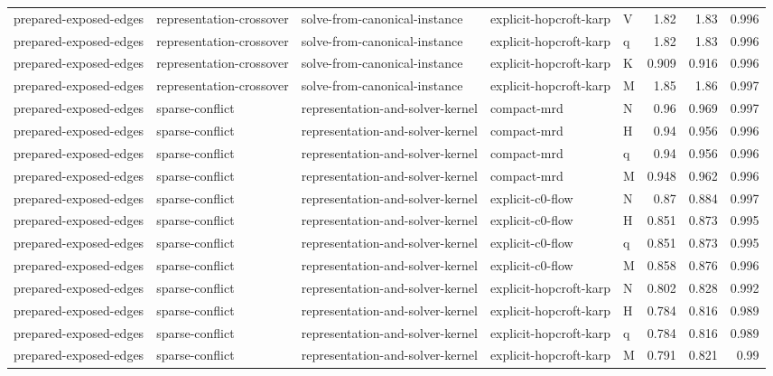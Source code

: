\begin{table}[t]
\begin{tabular}{lllllrrr}
prepared-exposed-edges & representation-crossover & solve-from-canonical-instance & explicit-hopcroft-karp & V & 1.82 & 1.83 & 0.996 \\
prepared-exposed-edges & representation-crossover & solve-from-canonical-instance & explicit-hopcroft-karp & q & 1.82 & 1.83 & 0.996 \\
prepared-exposed-edges & representation-crossover & solve-from-canonical-instance & explicit-hopcroft-karp & K & 0.909 & 0.916 & 0.996 \\
prepared-exposed-edges & representation-crossover & solve-from-canonical-instance & explicit-hopcroft-karp & M & 1.85 & 1.86 & 0.997 \\
prepared-exposed-edges & sparse-conflict & representation-and-solver-kernel & compact-mrd & N & 0.96 & 0.969 & 0.997 \\
prepared-exposed-edges & sparse-conflict & representation-and-solver-kernel & compact-mrd & H & 0.94 & 0.956 & 0.996 \\
prepared-exposed-edges & sparse-conflict & representation-and-solver-kernel & compact-mrd & q & 0.94 & 0.956 & 0.996 \\
prepared-exposed-edges & sparse-conflict & representation-and-solver-kernel & compact-mrd & M & 0.948 & 0.962 & 0.996 \\
prepared-exposed-edges & sparse-conflict & representation-and-solver-kernel & explicit-c0-flow & N & 0.87 & 0.884 & 0.997 \\
prepared-exposed-edges & sparse-conflict & representation-and-solver-kernel & explicit-c0-flow & H & 0.851 & 0.873 & 0.995 \\
prepared-exposed-edges & sparse-conflict & representation-and-solver-kernel & explicit-c0-flow & q & 0.851 & 0.873 & 0.995 \\
prepared-exposed-edges & sparse-conflict & representation-and-solver-kernel & explicit-c0-flow & M & 0.858 & 0.876 & 0.996 \\
prepared-exposed-edges & sparse-conflict & representation-and-solver-kernel & explicit-hopcroft-karp & N & 0.802 & 0.828 & 0.992 \\
prepared-exposed-edges & sparse-conflict & representation-and-solver-kernel & explicit-hopcroft-karp & H & 0.784 & 0.816 & 0.989 \\
prepared-exposed-edges & sparse-conflict & representation-and-solver-kernel & explicit-hopcroft-karp & q & 0.784 & 0.816 & 0.989 \\
prepared-exposed-edges & sparse-conflict & representation-and-solver-kernel & explicit-hopcroft-karp & M & 0.791 & 0.821 & 0.99 \\

\end{tabular}
\end{table}
